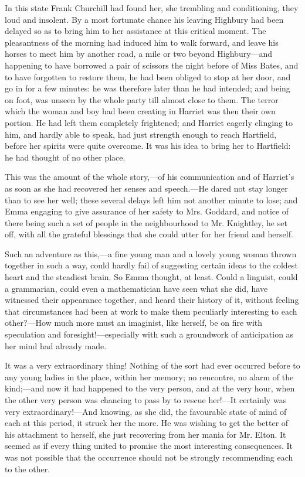 In this state Frank Churchill had found her, she trembling and conditioning, they loud and insolent. By a most fortunate chance his leaving Highbury had been delayed so as to bring him to her assistance at this critical moment. The pleasantness of the morning had induced him to walk forward, and leave his horses to meet him by another road, a mile or two beyond Highbury---and happening to have borrowed a pair of scissors the night before of Miss Bates, and to have forgotten to restore them, he had been obliged to stop at her door, and go in for a few minutes: he was therefore later than he had intended; and being on foot, was unseen by the whole party till almost close to them. The terror which the woman and boy had been creating in Harriet was then their own portion. He had left them completely frightened; and Harriet eagerly clinging to him, and hardly able to speak, had just strength enough to reach Hartfield, before her spirits were quite overcome. It was his idea to bring her to Hartfield: he had thought of no other place.

This was the amount of the whole story,---of his communication and of Harriet's as soon as she had recovered her senses and speech.---He dared not stay longer than to see her well; these several delays left him not another minute to lose; and Emma engaging to give assurance of her safety to Mrs. Goddard, and notice of there being such a set of people in the neighbourhood to Mr. Knightley, he set off, with all the grateful blessings that she could utter for her friend and herself.

Such an adventure as this,---a fine young man and a lovely young woman thrown together in such a way, could hardly fail of suggesting certain ideas to the coldest heart and the steadiest brain. So Emma thought, at least. Could a linguist, could a grammarian, could even a mathematician have seen what she did, have witnessed their appearance together, and heard their history of it, without feeling that circumstances had been at work to make them peculiarly interesting to each other?---How much more must an imaginist, like herself, be on fire with speculation and foresight!---especially with such a groundwork of anticipation as her mind had already made.

It was a very extraordinary thing! Nothing of the sort had ever occurred before to any young ladies in the place, within her memory; no rencontre, no alarm of the kind;---and now it had happened to the very person, and at the very hour, when the other very person was chancing to pass by to rescue her!---It certainly was very extraordinary!---And knowing, as she did, the favourable state of mind of each at this period, it struck her the more. He was wishing to get the better of his attachment to herself, she just recovering from her mania for Mr. Elton. It seemed as if every thing united to promise the most interesting consequences. It was not possible that the occurrence should not be strongly recommending each to the other.

